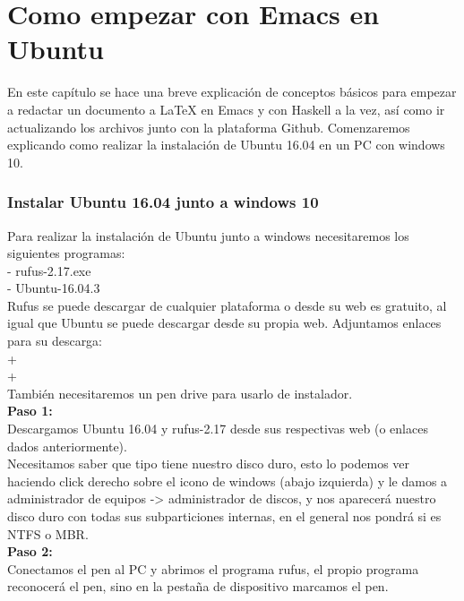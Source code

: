 \chapter{Como empezar con Emacs en Ubuntu}\label{sec:InCapHas}

En este capítulo se hace una breve explicación de conceptos básicos para empezar a redactar un documento a LaTeX en Emacs y con Haskell a la vez, así como ir actualizando los archivos junto con la plataforma Github. Comenzaremos explicando como realizar la instalación de Ubuntu 16.04 en un PC con windows 10.\\

\subsection{Instalar Ubuntu 16.04 junto a windows 10}

Para realizar la instalación de Ubuntu junto a windows necesitaremos los siguientes programas:\\

- rufus-2.17.exe\\

- Ubuntu-16.04.3\\

Rufus se puede descargar de cualquier plataforma o desde su web es gratuito, al igual que Ubuntu se puede descargar desde su propia web. Adjuntamos enlaces para su descarga:\\
+\\
+\\

También necesitaremos un pen drive para usarlo de instalador.\\

\textbf{Paso 1:}\\
Descargamos Ubuntu 16.04 y rufus-2.17 desde sus respectivas web (o enlaces dados anteriormente).\\
Necesitamos saber que tipo tiene nuestro disco duro, esto lo podemos ver haciendo click derecho sobre el icono de windows (abajo izquierda) y le damos a administrador de equipos -> administrador de discos, y nos aparecerá nuestro disco duro con todas sus subparticiones internas, en el general nos pondrá si es NTFS o MBR.\\

\textbf{Paso 2:}\\
Conectamos el pen al PC y abrimos el programa rufus, el propio programa reconocerá el pen, sino en la pestaña de dispositivo marcamos el pen.\\

